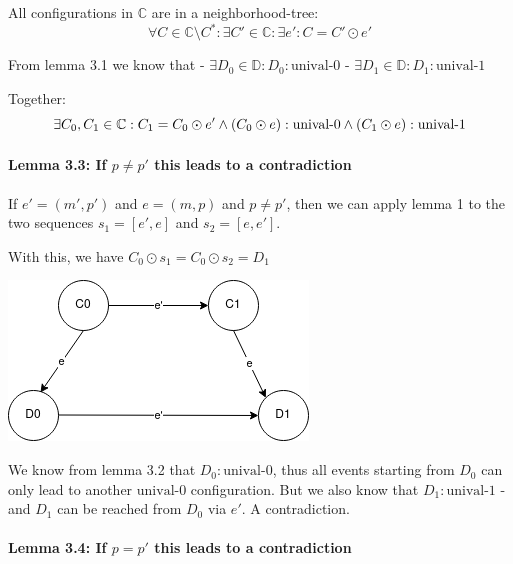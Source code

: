 All configurations in \(\mathbb{C}\) are in a neighborhood-tree: \[
\forall C \in \mathbb{C} \setminus C^*: \exists C' \in \mathbb{C}: \exists e': C = C' \odot e'
\]

From lemma 3.1 we know that -
\(\exists D_0 \in \mathbb{D}: D_0:\text{unival-0}\) -
\(\exists D_1 \in \mathbb{D}: D_1:\text{unival-1}\)

Together: \[
\exists C_0, C_1 \in \mathbb{C}: C_1 = C_0 \odot e' \\
\land (C_0 \odot e):\text{unival-0} \\
\land (C_1 \odot e):\text{unival-1}
\]

\hypertarget{lemma-3.3-if-p-neq-p-this-leads-to-a-contradiction}{%
\paragraph{\texorpdfstring{Lemma 3.3: If \(p \neq p'\) this leads to a
contradiction}{Lemma 3.3: If p \textbackslash neq p' this leads to a contradiction}}\label{lemma-3.3-if-p-neq-p-this-leads-to-a-contradiction}}

If \(e' = (m', p')\) and \(e = (m, p)\) and \(p \neq p'\), then we can
apply lemma 1 to the two sequences \(s_1 = [e', e]\) and
\(s_2 = [e, e']\).

With this, we have \(C_0 \odot s_1 = C_0 \odot s_2 = D_1\)

\includegraphics{images/flp_lemma_33.png}


We know from lemma 3.2 that \(D_0:\text{unival-0}\), thus all events
starting from \(D_0\) can only lead to another \(\text{unival-0}\)
configuration. But we also know that \(D_1:\text{unival-1}\) - and
\(D_1\) can be reached from \(D_0\) via \(e'\). A contradiction.

\hypertarget{lemma-3.4-if-p-p-this-leads-to-a-contradiction}{%
\paragraph{\texorpdfstring{Lemma 3.4: If \(p = p'\) this leads to a
contradiction}{Lemma 3.4: If p = p' this leads to a contradiction}}\label{lemma-3.4-if-p-p-this-leads-to-a-contradiction}}

